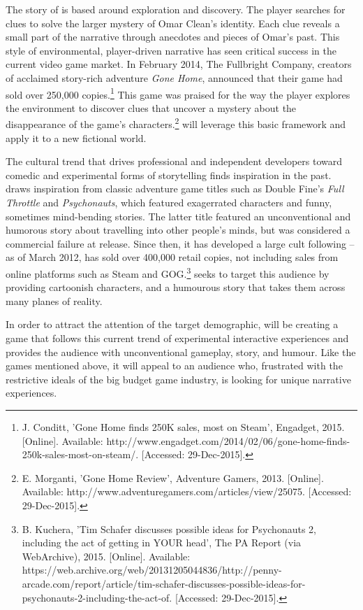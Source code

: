 The story of \ourgame{} is based around exploration and discovery. The player searches for clues to solve the larger mystery of Omar Clean's identity. Each clue reveals a small part of the narrative through anecdotes and pieces of Omar's past. This style of environmental, player-driven narrative has seen critical success in the current video game market. In February 2014, The Fullbright Company, creators of acclaimed story-rich adventure \textit{Gone Home}, announced that their game had sold over 250,000 copies.\footnote{J. Conditt, 'Gone Home finds 250K sales, most on Steam', Engadget, 2015. [Online]. Available: http://www.engadget.com/2014/02/06/gone-home-finds-250k-sales-most-on-steam/. [Accessed: 29-Dec-2015].} This game was praised for the way the player explores the environment to discover clues that uncover a mystery about the disappearance of the game's characters.\footnote{E. Morganti, 'Gone Home Review', Adventure Gamers, 2013. [Online]. Available: http://www.adventuregamers.com/articles/view/25075. [Accessed: 29-Dec-2015].} \ourgame{} will leverage this basic framework and apply it to a new fictional world.

The cultural trend that drives professional and independent developers toward comedic and experimental forms of storytelling finds inspiration in the past. \ourgame{} draws inspiration from classic adventure game titles such as Double Fine's \textit{Full Throttle} and  \textit{Psychonauts}, which featured exagerrated characters and funny, sometimes mind-bending stories. The latter title featured an unconventional and humorous story about travelling into other people's minds, but was considered a commercial failure at release. Since then, it has developed a large cult following -- as of March 2012, has sold over 400,000 retail copies, not including sales from online platforms such as Steam and GOG.\footnote{B. Kuchera, 'Tim Schafer discusses possible ideas for Psychonauts 2, including the act of getting in YOUR head', The PA Report (via WebArchive), 2015. [Online]. Available: https://web.archive.org/web/20131205044836/http://penny-arcade.com/report/article/tim-schafer-discusses-possible-ideas-for-psychonauts-2-including-the-act-of. [Accessed: 29-Dec-2015].} \ourgame{} seeks to target this audience by providing cartoonish characters, and a humourous story that takes them across many planes of reality.

In order to attract the attention of the target demographic, \ourteam{} will be creating a game that follows this current trend of experimental interactive experiences and provides the audience with unconventional gameplay, story, and humour. Like the games mentioned above, it will appeal to an audience who, frustrated with the restrictive ideals of the big budget game industry, is looking for unique narrative experiences.